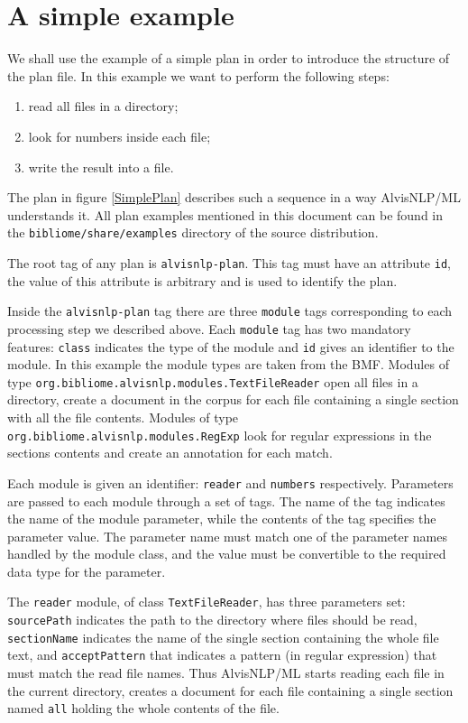 \documentclass[a4paper]{book}
\begin{document}
\section{A simple example}
We shall use the example of a simple plan in order to introduce the structure of the plan file.
In this example we want to perform the following steps:
\begin{enumerate}
\item read all files in a directory;
\item look for numbers inside each file;
\item write the result into a file.
\end{enumerate}
The plan in figure \ref{SimplePlan} describes such a sequence in a way AlvisNLP/ML understands it.
All plan examples mentioned in this document can be found in the \texttt{bibliome/share/examples} directory of the source distribution.


The root tag of any plan is \texttt{alvisnlp-plan}.
This tag must have an attribute \texttt{id}, the value of this attribute is arbitrary and is used to identify the plan.

Inside the \texttt{alvisnlp-plan} tag there are three \texttt{module} tags corresponding to each processing step we described above.
Each \texttt{module} tag has two mandatory features: \texttt{class} indicates the type of the  module and \texttt{id} gives an identifier to the module.
In this example the module types are taken from the BMF.
Modules of type \texttt{org.bibliome.alvisnlp.modules.TextFileReader} open all files in a directory, create a document in the corpus for each file containing a single section with all the file contents.
Modules of type \texttt{org.bibliome.alvisnlp.modules.RegExp} look for regular expressions in the sections contents and create an annotation for each match.

Each module is given an identifier: \texttt{reader} and \texttt{numbers} respectively.
Parameters are passed to each module through a set of tags.
The name of the tag indicates the name of the module parameter, while the contents of the tag specifies the parameter value.
The parameter name must match one of the parameter names handled by the module class, and the value must be convertible to the required data type for the parameter.

The \texttt{reader} module, of class \texttt{TextFileReader}, has three parameters set: \texttt{sourcePath} indicates the path to the directory where files should be read, \texttt{sectionName} indicates the name of the single section containing the whole file text, and \texttt{acceptPattern} that indicates a pattern (in regular expression) that must match the read file names.
Thus AlvisNLP/ML starts reading each file in the current directory, creates a document for each file containing a single section named \texttt{all} holding the whole contents of the file.
\end{document}

